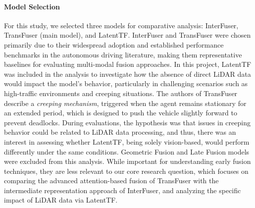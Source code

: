 \paragraph{Model Selection}
For this study, we selected three models for comparative analysis: InterFuser, TransFuser (main model), and LatentTF. InterFuser and TransFuser were chosen primarily due to their widespread adoption and established performance benchmarks in the autonomous driving literature, making them representative baselines for evaluating multi-modal fusion approaches. 
In this project, LatentTF was included in the analysis to investigate how the absence of direct LiDAR data would impact the model’s behavior, particularly in challenging scenarios such as high-traffic environments and creeping situations. The authors of TransFuser describe a \textit{creeping mechanism}, triggered when the agent remains stationary for an extended period, which is designed to push the vehicle slightly forward to prevent deadlocks. During evaluations, the hypothesis was that issues in creeping behavior could be related to LiDAR data processing, and thus, there was an interest in assessing whether LatentTF, being solely vision-based, would perform differently under the same conditions. Geometric Fusion and Late Fusion models were excluded from this analysis. While important for understanding early fusion techniques, they are less relevant to our core research question, which focuses on comparing the advanced attention-based fusion of TransFuser with the intermediate representation approach of InterFuser, and analyzing the specific impact of LiDAR data via LatentTF.